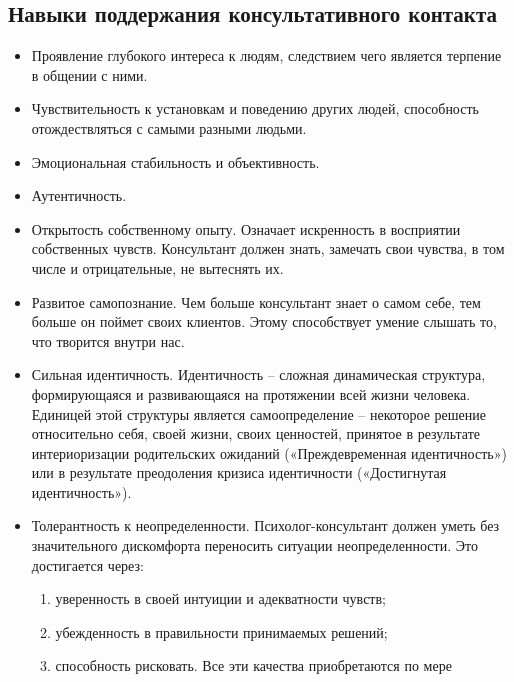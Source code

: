 \documentclass[a4paper, 12pt]{report}
\begin{document}
    \subsection*{Навыки поддержания консультативного контакта}
\begin{itemize}
    \item Проявление глубокого интереса к людям, следствием чего является
    терпение в общении с ними.
    \item Чувствительность к установкам и поведению других людей, способность
    отождествляться с самыми разными людьми.
    \item Эмоциональная стабильность и объективность.
    \item Аутентичность.
    \item Открытость собственному опыту. Означает искренность в восприятии
    собственных чувств. Консультант должен знать, замечать свои чувства, в
    том числе и отрицательные, не вытеснять их.
    \item Развитое самопознание. Чем больше консультант знает о самом себе, тем
    больше он поймет своих клиентов. Этому способствует умение слышать
    то, что творится внутри нас.
    \item Сильная идентичность. Идентичность – сложная динамическая структура,
    формирующаяся и развивающаяся на протяжении всей жизни человека.
    Единицей этой структуры является самоопределение – некоторое решение
    относительно себя, своей жизни, своих ценностей, принятое в результате
    интериоризации родительских ожиданий («Преждевременная
    идентичность») или в результате преодоления кризиса идентичности
    («Достигнутая идентичность»).
    \item Толерантность к неопределенности. Психолог-консультант должен уметь
    без значительного дискомфорта переносить ситуации неопределенности.
    Это достигается через: 
    \begin{enumerate} \setlength\itemsep{0pt}
        \item уверенность в своей интуиции и адекватности 
        чувств; 
        \item убежденность в правильности принимаемых решений;
        \item способность рисковать. Все эти качества приобретаются по мере
    \end{enumerate}
  

\end{itemize}
\end{document}
